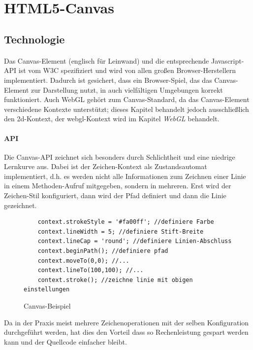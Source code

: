 \documentclass[a4paper, 12pt]{article}
\begin{document}
\section{HTML5-Canvas}
\subsection{Technologie}
\paragraph{} Das Canvas-Element (englisch für Leinwand) und die entsprechende Javascript-API ist vom W3C spezifiziert und wird von allen großen Browser-Herstellern implementiert. Dadurch ist gesichert, dass ein Browser-Spiel, das das Canvas-Element zur Darstellung nutzt, in auch vielfältigen  Umgebungen korrekt funktioniert. Auch WebGL gehört zum Canvas-Standard, da das Canvas-Element verschiedene Kontexte unterstützt; dieses Kapitel behandelt jedoch ausschließlich den \glqq 2d\grqq-Kontext, der \glqq webgl\grqq-Kontext wird im Kapitel \emph{WebGL} behandelt.
\paragraph{API} Die Canvas-API zeichnet sich besonders durch Schlichtheit und eine niedrige Lernkurve aus. Dabei ist der Zeichen-Kontext als Zustandsautomat implementiert, d.h. es werden nicht alle Informationen zum Zeichnen einer Linie in einem Methoden-Aufruf mitgegeben, sondern in mehreren. Erst wird der Zeichen-Stil konfiguriert, dann wird der Pfad definiert und dann die Linie gezeichnet.
\begin{figure}[h!]
	\begin{verbatim}
	context.strokeStyle = '#fa00ff'; //definiere Farbe
	context.lineWidth = 5; //definiere Stift-Breite
	context.lineCap = 'round'; //definiere Linien-Abschluss
	context.beginPath(); //definiere pfad
	context.moveTo(0,0); //...
	context.lineTo(100,100); //...
	context.stroke(); //zeichne linie mit obigen einstellungen
	\end{verbatim}
	\caption{Canvas-Beispiel}
	\label{canvas-example}
\end{figure}
Da in der Praxis meist mehrere Zeichenoperationen mit der selben Konfiguration durchgeführt werden, hat dies den Vorteil dass so Rechenleistung gespart werden kann und der Quellcode einfacher bleibt.
\end{document}
